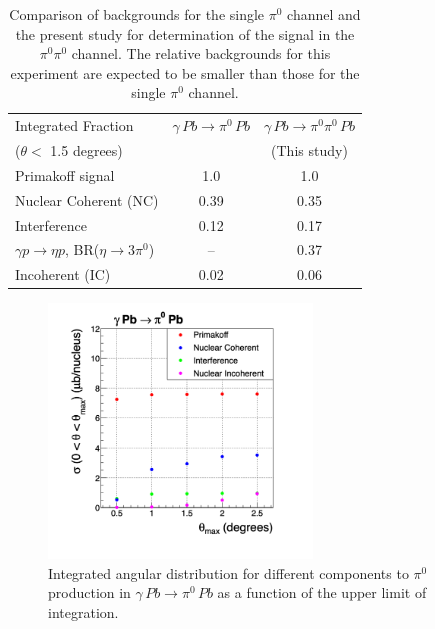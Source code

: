 \begin{table}[t]
\caption{Comparison of backgrounds for the single $\pi^0$ channel and the present study for 
determination of the signal in the $\pi^0\pi^0$ channel. The relative backgrounds for this experiment
are expected to be smaller than those for the single $\pi^0$ channel.
\label{tab:Primex_sigmas}
}
\begin{center}
\begin{tabular}{|l|c|c|}
\hline
\hline 
 Integrated Fraction & $\gamma\,Pb\to \pi^0\, Pb$  & $\gamma\,Pb\to \pi^0\pi^0\, Pb$ \\  
  ($\theta <$ 1.5 degrees)                    &       & (This study) \\  \hline
  Primakoff signal  &   1.0   & 1.0   \\ \hline 
  Nuclear Coherent (NC)  & 0.39  &   0.35   \\ \hline 
  Interference  & 0.12  &  0.17   \\ \hline 
  $\gamma p \rightarrow \eta p$, BR($\eta \rightarrow 3\pi^0$)  &   -- & 0.37   \\ \hline 
  Incoherent (IC)  &   0.02  & 0.06  \\
  \hline   
  \hline
\end{tabular}
\end{center}
\end{table}





\begin{figure}[tbp]
\begin{center}
\includegraphics[width=7cm,angle=0]{figures/Primex_sigmas_c1.png}
\end{center}
\caption{Integrated angular distribution for different components to $\pi^0$ production in $\gamma\,Pb\rightarrow\pi^0\,Pb$ as a function of the upper limit of integration.}
\label{fig:Primex_sigmas_c1}
\end{figure}


